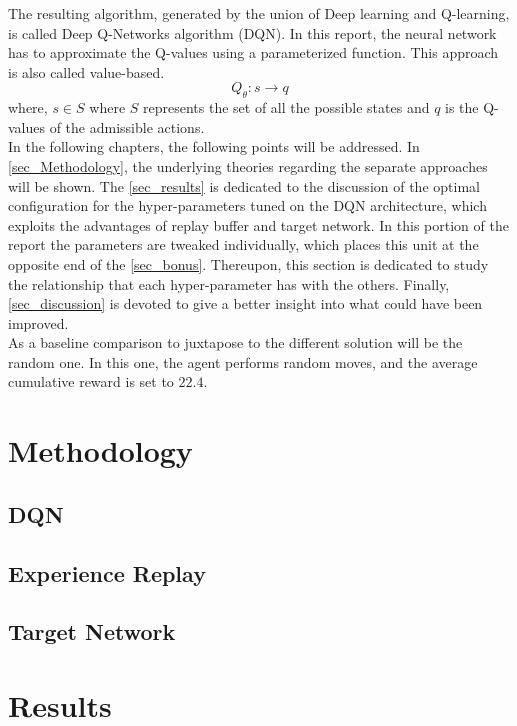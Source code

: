 \documentclass{article}
\begin{document}
The resulting algorithm, generated by the union of Deep learning and Q-learning, is called Deep Q-Networks algorithm (DQN). 
In this report, the neural network has to approximate the Q-values using a parameterized function. This approach is also called value-based.
\begin{equation}
    Q_{\theta} :  s \rightarrow q
\end{equation}
where, $s \in S$ where $S$ represents the set of all the possible states and $q$ is the Q-values of the admissible actions.\\
In the following chapters, the following points will be addressed. 
In \autoref{sec_Methodology}, the underlying theories regarding the separate approaches will be shown.
The \autoref{sec_results} is dedicated to the discussion of the optimal configuration for the hyper-parameters tuned on the DQN architecture, which exploits the advantages of replay buffer and target network. 
In this portion of the report the parameters are tweaked individually, which places this unit at the opposite end of the \autoref{sec_bonus}. 
Thereupon, this section is dedicated to study the relationship that each hyper-parameter has with the others.
Finally, \autoref{sec_discussion} is devoted to give a better insight into what could have been improved.\\
As a baseline comparison to juxtapose to the different solution will be the random one. In this one, the agent performs random moves, and the average cumulative reward is set to $22.4$.

\section{Methodology}
\label{sec_Methodology}

\subsection{DQN}

\subsection{Experience Replay}

\subsection{Target Network}



\section{Results}
\label{sec_results}
\end{document}
